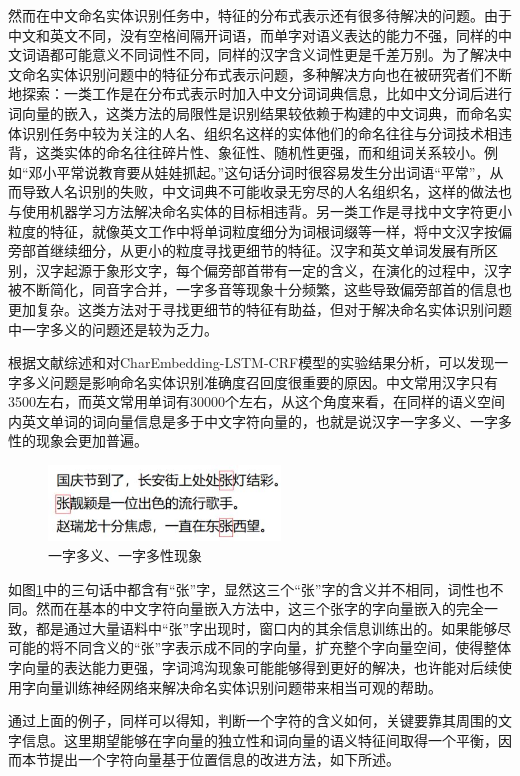 \documentclass[winfonts,master,oneside,nobackinfo]{njuthesis}
\begin{document}
然而在中文命名实体识别任务中，特征的分布式表示还有很多待解决的问题。由于中文和英文不同，没有空格间隔开词语，而单字对语义表达的能力不强，同样的中文词语都可能意义不同词性不同，同样的汉字含义词性更是千差万别。为了解决中文命名实体识别问题中的特征分布式表示问题，多种解决方向也在被研究者们不断地探索：一类工作是在分布式表示时加入中文分词词典信息，比如中文分词后进行词向量的嵌入，这类方法的局限性是识别结果较依赖于构建的中文词典，而命名实体识别任务中较为关注的人名、组织名这样的实体他们的命名往往与分词技术相违背，这类实体的命名往往碎片性、象征性、随机性更强，而和组词关系较小。例如“邓小平常说教育要从娃娃抓起。”这句话分词时很容易发生分出词语“平常”，从而导致人名识别的失败，中文词典不可能收录无穷尽的人名组织名，这样的做法也与使用机器学习方法解决命名实体的目标相违背。另一类工作是寻找中文字符更小粒度的特征，就像英文工作中将单词粒度细分为词根词缀等一样，将中文汉字按偏旁部首继续细分，从更小的粒度寻找更细节的特征。汉字和英文单词发展有所区别，汉字起源于象形文字，每个偏旁部首带有一定的含义，在演化的过程中，汉字被不断简化，同音字合并，一字多音等现象十分频繁，这些导致偏旁部首的信息也更加复杂。这类方法对于寻找更细节的特征有助益，但对于解决命名实体识别问题中一字多义的问题还是较为乏力。

根据文献综述和对CharEmbedding-LSTM-CRF模型的实验结果分析，可以发现一字多义问题是影响命名实体识别准确度召回度很重要的原因。中文常用汉字只有3500左右，而英文常用单词有30000个左右，从这个角度来看，在同样的语义空间内英文单词的词向量信息是多于中文字符向量的，也就是说汉字一字多义、一字多性的现象会更加普遍。

\begin{figure}[ht]
\centering
\includegraphics[width=0.55\textwidth]{./figure/一字多义.jpg}
\caption{一字多义、一字多性现象}
\label{one2many}
\end{figure}

如图\ref{one2many}中的三句话中都含有“张”字，显然这三个“张”字的含义并不相同，词性也不同。然而在基本的中文字符向量嵌入方法中，这三个张字的字向量嵌入的完全一致，都是通过大量语料中“张”字出现时，窗口内的其余信息训练出的。如果能够尽可能的将不同含义的“张”字表示成不同的字向量，扩充整个字向量空间，使得整体字向量的表达能力更强，字词鸿沟现象可能能够得到更好的解决，也许能对后续使用字向量训练神经网络来解决命名实体识别问题带来相当可观的帮助。

通过上面的例子，同样可以得知，判断一个字符的含义如何，关键要靠其周围的文字信息。这里期望能够在字向量的独立性和词向量的语义特征间取得一个平衡，因而本节提出一个字符向量基于位置信息的改进方法，如下所述。
\end{document}
